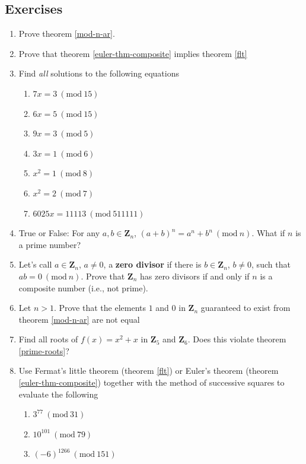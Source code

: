 \documentclass[12pt]{article}
\numberwithin{equation}{subsection}
\theoremstyle{note}
\newcommand{\Mod}[1]{\ (\mathrm{mod}\ #1)}
\begin{document}
\subsection{Exercises} \label{mod-ex}
\begin{enumerate}[label=\arabic*.]

	\item Prove theorem \ref{mod-n-ar}.
	\item Prove that theorem \ref{euler-thm-composite} implies theorem \ref{flt}
	\item Find \textit{all} solutions to the following equations
		\begin{enumerate}
			\item $7x=3\Mod{15}$
			\item $6x=5\Mod{15}$
			\item $9x=3\Mod{5}$
			\item $3x=1\Mod{6}$
			\item $x^2=1\Mod{8}$
			\item $x^2=2\Mod{7}$		
			\item $6025x=11113 \Mod{511111}$
		\end{enumerate}
	\item True or False: For any $a,b\in\mathbf{Z}_n$, $(a+b)^n=a^n+b^n\Mod{n}$. What if $n$ is a prime number?
	
	\item Let's call $a\in\mathbf{Z}_n$, $a\neq 0$, a \textbf{zero divisor} if there is $b\in\mathbf{Z}_n$, $b\neq 0$, such that $ab=0\Mod{n}$. Prove that $\mathbf{Z}_n$ has zero divisors if and only if $n$ is a composite number (i.e., not prime). 
	
	\item Let $n>1$. Prove that the elements $1$ and $0$ in $\mathbf{Z}_n$ guaranteed to exist from theorem \ref{mod-n-ar} are not equal
	
	\item Find all roots of $f(x)=x^2+x$ in $\mathbf{Z}_5$ and $\mathbf{Z}_6$. Does this violate theorem \ref{prime-roots}?
	
	\item Use Fermat's little theorem (theorem \ref{flt}) or Euler's theorem (theorem \ref{euler-thm-composite}) together with the method of successive squares to evaluate the following
	\begin{enumerate}
		\item $3^{77}\Mod{31}$
		\item $10^{101}\Mod{79}$
		\item $(-6)^{1266}\Mod{151}$%
	\end{enumerate}
	

\end{enumerate}
\end{document}
